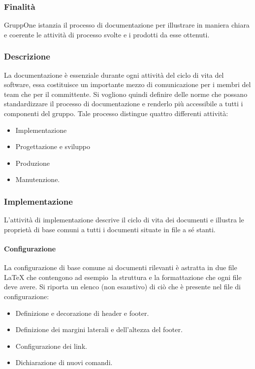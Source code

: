 \documentclass[../../norme-di-progetto.tex]{subfiles}
\begin{document}
\subsubsection{Finalità}%
\label{subs:documentazione/finalita}

GruppOne istanzia il processo di documentazione per illustrare in maniera chiara e coerente le attività di processo svolte e i prodotti da esse ottenuti.

\subsubsection{Descrizione}%
\label{subs:documentazione/descrizione}

La documentazione è essenziale durante ogni attività del ciclo di vita del software, essa costituisce un importante mezzo di comunicazione per i membri del team che per il committente.
Si vogliono quindi definire delle norme che possano standardizzare il processo di documentazione e renderlo più accessibile a tutti i componenti del gruppo.
Tale processo distingue quattro differenti attività:
\begin{itemize}
  \item  Implementazione
  \item  Progettazione e sviluppo
  \item  Produzione
  \item  Manutenzione.
\end{itemize}

\subsubsection{Implementazione}%
\label{subs:implementazione}
L'attività di implementazione descrive il ciclo di vita dei documenti e illustra le proprietà di base comuni a tutti i documenti situate in file a sé stanti.

\paragraph{Configurazione}%
\label{par:configurazione}
La configurazione di base comune ai documenti rilevanti è astratta in due file \LaTeX{} che contengono ad esempio\ la struttura e la formattazione che ogni file deve avere.
Si riporta un elenco (non esaustivo) di ciò che è presente nel file di configurazione:

\begin{itemize}
  \item Definizione e decorazione di header e footer.
  \item Definizione dei margini laterali e dell'altezza del footer.
  \item Configurazione dei link.
  \item Dichiarazione di nuovi comandi.
\end{itemize}
\end{document}

